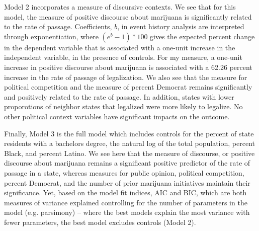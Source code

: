 %


%


%







Model 2 incorporates a measure of discursive contexts. We see that for this model, the measure of positive discourse about marijuana is significantly related to the rate of passage. 
Coefficients, $b$, in event history analysis are interpreted through exponentiation, where $(e^{b} - 1)*100$ gives the expected percent change in the dependent variable that is associated with a one-unit increase in the independent variable, in the presence of controls. For my measure, a one-unit increase in positive discourse about marijuana is associated with a 62.26 percent increase in the rate of passage of legalization.
We also see that the measure for political competition and the measure of percent Democrat remains significantly and positively related to the rate of passage. In addition, states with lower proporotions of neighbor states that legalized were more likely to legalize. No other political context variables have significant impacts on the outcome.

Finally, Model 3 is the full model which includes controls for the percent of state residents with a bachelors degree, the natural log of the total population, percent Black, and percent Latino. We see here that the measure of discourse, or positive discourse about marijuana remains a significant positive predictor of the rate of passage in a state, whereas measures for public opinion, political competition, percent Democrat, and the number of prior marijuana initiatives maintain their significance. Yet, based on the model fit indices, AIC and BIC, which are both measures of variance explained controlling for the number of parameters in the model (e.g. parsimony) -- where the best models explain the most variance with fewer parameters, the best model excludes controls (Model 2).


